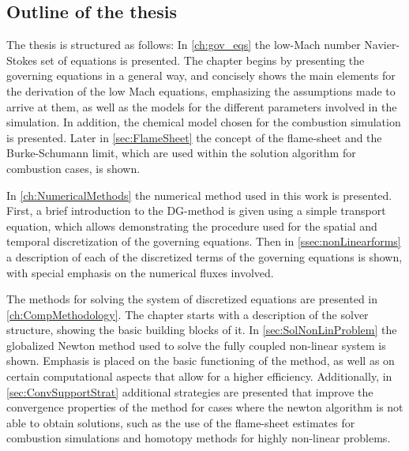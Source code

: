 \subsection{Outline of the thesis}
The thesis is structured as follows: In \cref{ch:gov_eqs} the low-Mach number Navier-Stokes set of equations is presented. The chapter begins by presenting the governing equations in a general way, and concisely shows the main elements for the derivation of the low Mach equations, emphasizing the assumptions made to arrive at them, as well as the models for the different parameters involved in the simulation. In addition, the chemical model chosen for the combustion simulation is presented. Later in \cref{sec:FlameSheet} the concept of the flame-sheet and the Burke-Schumann limit, which are used within the solution algorithm for combustion cases, is shown. 

In \cref{ch:NumericalMethods} the numerical method used in this work is presented. First, a brief introduction to the DG-method is given using a simple transport equation, which allows demonstrating the procedure used for the spatial and temporal discretization of the governing equations. Then in \cref{ssec:nonLinearforms} a description of each of the discretized terms of the governing equations is shown, with special emphasis on the numerical fluxes involved.

The methods for solving the system of discretized equations are presented in \cref{ch:CompMethodology}. The chapter starts with a description of the solver structure, showing the basic building blocks of it. In \cref{sec:SolNonLinProblem} the globalized Newton method used to solve the fully coupled non-linear system is shown. Emphasis is placed on the basic functioning of the method, as well as on certain computational aspects that allow for a higher efficiency. Additionally, in \cref{sec:ConvSupportStrat} additional strategies are presented that improve the convergence properties of the method for cases where the newton algorithm is not able to obtain solutions, such as the use of the flame-sheet estimates for combustion simulations and homotopy methods for highly non-linear problems.

